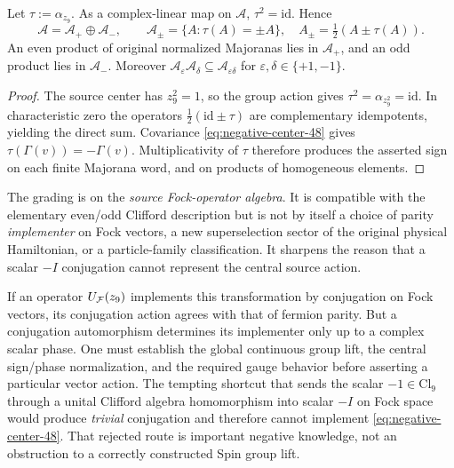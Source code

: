 \begin{proposition}\label{prop:original-parity-grading}
Let $\tau:=\alpha_{z_9}$. As a complex-linear map on
$\mathscr A$, $\tau^2=\mathrm{id}$. Hence
\begin{equation}\label{eq:original-parity-splitting}
 \mathscr A=\mathscr A_+\oplus\mathscr A_-,
 \qquad
 \mathscr A_\pm=\{A:\tau(A)=\pm A\},
 \quad
 A_\pm=\tfrac12(A\pm\tau(A)).
\end{equation}
An even product of original normalized Majoranas lies in
$\mathscr A_+$, and an odd product lies in $\mathscr A_-$.
Moreover $\mathscr A_\varepsilon\mathscr A_\delta
\subseteq\mathscr A_{\varepsilon\delta}$ for
$\varepsilon,\delta\in\{+1,-1\}$.
\end{proposition}
\begin{proof}
The source center has $z_9^2=1$, so the group action gives
$\tau^2=\alpha_{z_9^2}=\mathrm{id}$. In characteristic zero
the operators $\frac12(\mathrm{id}\pm\tau)$ are complementary
idempotents, yielding the direct sum. Covariance
\eqref{eq:negative-center-48} gives
$\tau(\Gamma(v))=-\Gamma(v)$. Multiplicativity of $\tau$
therefore produces the asserted sign on each finite Majorana
word, and on products of homogeneous elements.
\end{proof}
The grading is on the \emph{source Fock-operator algebra}.
It is compatible with the elementary even/odd Clifford
description but is not by itself a choice of parity
\emph{implementer} on Fock vectors, a new superselection
sector of the original physical Hamiltonian, or a particle-family
classification. It sharpens the reason that a scalar $-I$
conjugation cannot represent the central source action.

If an operator $U_{\mathcal F}(z_9)$ implements this transformation by
conjugation on Fock vectors, its conjugation action agrees with that of
fermion parity. But a conjugation automorphism determines its implementer
only up to a complex scalar phase. One must establish the global
continuous group lift, the central sign/phase normalization, and the
required gauge behavior before asserting a particular vector action.
The tempting shortcut that sends the scalar $-1\in\mathrm{Cl}_9$
through a unital Clifford algebra homomorphism into scalar $-I$ on
Fock space would produce \emph{trivial} conjugation and therefore
cannot implement \eqref{eq:negative-center-48}. That rejected route
is important negative knowledge, not an obstruction to a correctly
constructed Spin group lift.

